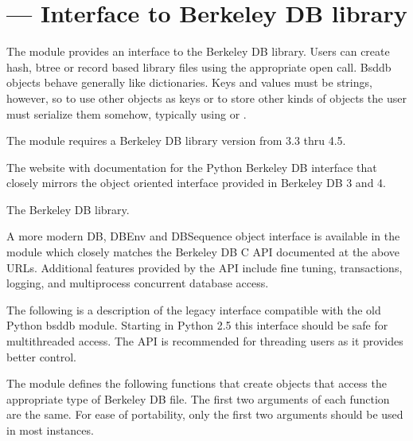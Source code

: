 \section{ ---
         Interface to Berkeley DB library}



The  module provides an interface to the Berkeley DB
library.  Users can create hash, btree or record based library files
using the appropriate open call. Bsddb objects behave generally like
dictionaries.  Keys and values must be strings, however, so to use
other objects as keys or to store other kinds of objects the user must
serialize them somehow, typically using  or 
.

The  module requires a Berkeley DB library version from
3.3 thru 4.5.

\begin{seealso}
         {The website with documentation for the 
          Python Berkeley DB interface that closely mirrors the object
          oriented interface provided in Berkeley DB 3 and 4.}

         {The Berkeley DB library.}
\end{seealso}

A more modern DB, DBEnv and DBSequence object interface is available in the
 module which closely matches the Berkeley DB C API
documented at the above URLs.  Additional features provided by the
 API include fine tuning, transactions, logging, and
multiprocess concurrent database access.

The following is a description of the legacy  interface
compatible with the old Python bsddb module.  Starting in Python 2.5 this
interface should be safe for multithreaded access.  The 
API is recommended for threading users as it provides better control.

The  module defines the following functions that create
objects that access the appropriate type of Berkeley DB file.  The
first two arguments of each function are the same.  For ease of
portability, only the first two arguments should be used in most
instances.


